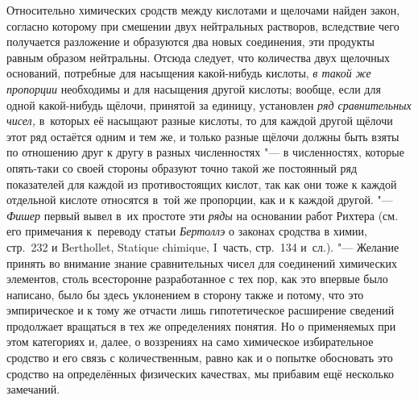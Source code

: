 Относительно химических сродств между кислотами и щелочами найден закон,
согласно которому при смешении двух нейтральных растворов, вследствие чего
получается разложение и образуются два новых соединения, эти продукты равным
образом нейтральны. Отсюда следует, что количества двух щелочных оснований,
потребные для насыщения какой-нибудь кислоты, {\em в такой же пропорции}
необходимы и для насыщения другой кислоты; вообще, если для одной какой-нибудь
щёлочи, принятой за единицу, установлен {\em ряд сравнительных чисел,}
в~которых её насыщают разные кислоты, то для каждой другой щёлочи этот ряд
остаётся одним и тем же, и только разные щёлочи должны быть взяты по отношению
друг к другу в разных численностях "--- в численностях, которые опять-таки со
своей стороны образуют точно такой же постоянный ряд показателей для каждой из
противостоящих кислот, так как они тоже к каждой отдельной кислоте относятся
в~той же пропорции, как и к каждой другой. "--- {\em Фишер} первый вывел
в~их простоте эти {\em ряды} на основании работ Рихтера (см. его примечания
к~переводу статьи {\em Бертоллэ} о законах сродства в химии, стр.~232 и
Ber\-thol\-let, Sta\-tique chi\-mique, I~часть, стр.~134 и~сл.). "--- Желание
принять во внимание знание сравнительных чисел для соединений химических
элементов, столь всесторонне разработанное с тех пор, как это впервые было
написано, было бы здесь уклонением в сторону также и потому, что это
эмпирическое и к тому же отчасти лишь гипотетическое расширение сведений
продолжает вращаться в тех же определениях понятия. Но о применяемых при этом
категориях и, далее, о воззрениях на само химическое избирательное сродство и
его связь с количественным, равно как и о попытке обосновать это сродство на
определённых физических качествах, мы прибавим ещё несколько замечаний.

